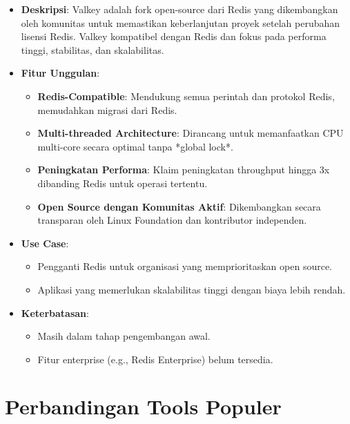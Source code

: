 \documentclass[11pt, a4paper]{book}
\begin{document}
	\begin{itemize}
		\item \textbf{Deskripsi}:  
		Valkey adalah fork open-source dari Redis yang dikembangkan oleh komunitas untuk memastikan keberlanjutan proyek setelah perubahan lisensi Redis. Valkey kompatibel dengan Redis dan fokus pada performa tinggi, stabilitas, dan skalabilitas.
		
		\item \textbf{Fitur Unggulan}:
		\begin{itemize}
			\item \textbf{Redis-Compatible}:  
			Mendukung semua perintah dan protokol Redis, memudahkan migrasi dari Redis.
			
			\item \textbf{Multi-threaded Architecture}:  
			Dirancang untuk memanfaatkan CPU multi-core secara optimal tanpa *global lock*.
			
			\item \textbf{Peningkatan Performa}:  
			Klaim peningkatan throughput hingga 3x dibanding Redis untuk operasi tertentu.
			
			\item \textbf{Open Source dengan Komunitas Aktif}:  
			Dikembangkan secara transparan oleh Linux Foundation dan kontributor independen.
		\end{itemize}
		
		\item \textbf{Use Case}:
		\begin{itemize}
			\item Pengganti Redis untuk organisasi yang memprioritaskan open source.
			\item Aplikasi yang memerlukan skalabilitas tinggi dengan biaya lebih rendah.
		\end{itemize}
		
		\item \textbf{Keterbatasan}:
		\begin{itemize}
			\item Masih dalam tahap pengembangan awal.
			\item Fitur enterprise (e.g., Redis Enterprise) belum tersedia.
		\end{itemize}
	\end{itemize}
	
	\section*{Perbandingan Tools Populer}
	\label{sec:perbandingan-tools}
	
\end{document}
